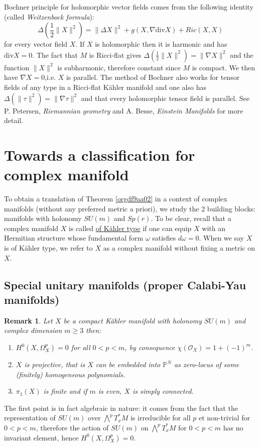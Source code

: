 \documentclass[11pt]{article}
\newtheorem{remark}{Remark}
\begin{document}
Bochner principle for holomorphic vector fields comes from the following identity (called \emph{Weitzenbock formula}):
\[
\Delta (\frac{1}{2}\|X\|^2) = \| \Delta X\|^2 + g(X, \nabla \text{div} X) + Ric(X,X)
\]
for every vector field \(X\). If \(X\) is holomorphic then it is harmonic and has \(\text{div} X = 0\). The
fact that \(M\) is Ricci-flat gives \(\Delta (\frac{1}{2}\|X\|^2) = \| \nabla X\|^2\) and the
function \(\| X\|^2\) is subharmonic, therefore constant since \(M\) is compact. We then have \(\nabla X =
0\),i.e. \(X\) is parallel. The method of Bochner also works for tensor fields of any type in
a Ricci-flat Kähler manifold and one also has \(\Delta(\|\tau \|^2) = \|\nabla\tau \|^2\) and that every
holomorphic tensor field is parallel. See P. Petersen, \emph{Riemannian geometry} and A. Besse, \emph{Einstein
Manifolds} for more detail.

\section{Towards a classification for complex manifold}
\label{sec:orgdbfd494}
To obtain a translation of Theorem \ref{orgdf9aa02} in a context of complex manifolds (without any
preferred metric a priori), we study the 2 building blocks: manifolds with holonomy \(SU(m)\) and
\(Sp(r)\). To be clear, recall that a complex manifold \(X\) is called \uline{of Kähler type} if one can
equip \(X\) with an Hermitian structure whose fundamental form \(\omega\) satisfies \(d\omega= 0\). When
we say \(X\) is of Kähler type, we refer to \(X\) as a complex manifold without fixing a metric on
\(X\). 
\subsection{Special unitary manifolds (proper Calabi-Yau manifolds)}
\label{sec:orgf819a06}
\begin{remark}
\label{rem:SU}
\label{org16e8097}
Let \(X\) be a compact Kähler manifold with holonomy \(SU(m)\) and complex dimension \(m\geq 3\) then:
\begin{enumerate}
\item \(H^0(X, \Omega_X^p)=0\) for all \(0 < p < m\), by consequence \(\chi( \mathcal{O}_X ) = 1 + (-1)^m\).
\item \(X\) is \emph{projective}, that is \(X\) can be embedded into \(\mathbb{P}^N\) as zero-locus of some
(finitely) homogeneous polynomials.
\item \(\pi_1(X)\) is finite and if \(m\) is even, \(X\) is simply connected.
\end{enumerate}
\end{remark}
The first point is in fact algebraic in nature: it comes from the fact that the representation of
\(SU(m)\) over \(\bigwedge^pT^*_xM\) is irreducible for all \(p\) et non-trivial for \(0<p<m\), therefore the
action of \(SU(m)\) on \(\bigwedge^pT^*_xM\) for \(0<p<m\) has no invariant element, hence
\(H^0(X,\Omega^p_X)=0\).
\end{document}
